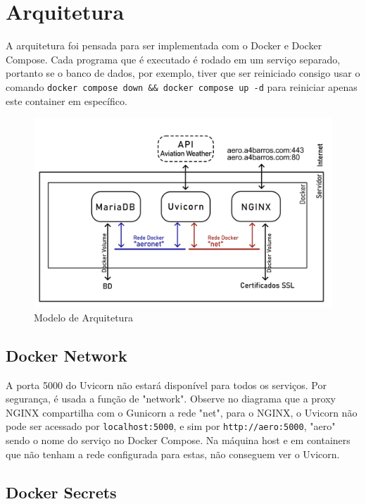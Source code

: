 \chapter{Arquitetura}

A arquitetura foi pensada para ser implementada com o Docker e Docker Compose. Cada
programa que é executado é rodado em um serviço separado, portanto se o banco de dados,
por exemplo, tiver que ser reiniciado consigo usar o comando \texttt{docker compose down \&\& docker compose up -d}
para reiniciar apenas este container em específico.

\begin{figure}[ht]
    \begin{center}
    \includegraphics[width=\linewidth]{img/diagrama-arquitetura.png}
    \caption{Modelo de Arquitetura}
    \label{fig:arquitetura}
    \end{center}
\end{figure}

\section{Docker Network}
A porta 5000 do Uvicorn não estará disponível para todos os serviços. Por segurança, é usada a função de
"network". Observe no diagrama que a proxy NGINX compartilha com o Gunicorn a rede "net", para o NGINX,
o Uvicorn não pode ser acessado por \texttt{localhost:5000}, e sim por \texttt{http://aero:5000}, "aero"
sendo o nome do serviço no Docker Compose. Na máquina host e em containers que não tenham a rede
configurada para estas, não conseguem ver o Uvicorn.


\section{Docker Secrets}

